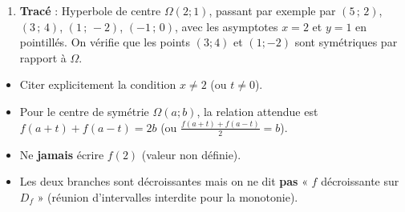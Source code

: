 \documentclass[11pt]{article}
\begin{document}
\begin{corrige}
\begin{enumerate}
\begin{center}
    \end{center}
    (En $2$ : valeur interdite, double barre ; limites $-\infty$ à gauche, $+\infty$ à droite.)
    \item \textbf{Tracé} : Hyperbole de centre $\Omega(2;1)$, passant par exemple par $(5\,;\,2)$, $(3\,;\,4)$, $(1\,;\,-2)$, $(-1\,;\,0)$, avec les asymptotes $x=2$ et $y=1$ en pointillés. On vérifie que les points $(3;4)$ et $(1;-2)$ sont symétriques par rapport à $\Omega$.
\end{enumerate}
\begin{attention}
\begin{itemize}
    \item Citer explicitement la condition $x\neq 2$ (ou $t\neq 0$).
    \item Pour le centre de symétrie $\Omega(a;b)$, la relation attendue est $f(a+t)+f(a-t)=2b$ (ou $\frac{f(a+t)+f(a-t)}{2}=b$).
    \item Ne \textbf{jamais} écrire $f(2)$ (valeur non définie).
    \item Les deux branches sont décroissantes mais on ne dit \textbf{pas} « $f$ décroissante sur $D_f$ » (réunion d'intervalles interdite pour la monotonie).
\end{itemize}
\end{attention}
\end{corrige}
\end{document}
